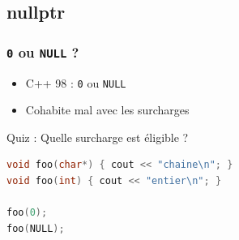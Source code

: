 \documentclass[C++.tex]{subfiles}
\begin{document}
\subsection*{nullptr}
\begin{frame}[fragile]
	\frametitle{\lstinline|0| ou \lstinline|NULL| ?}
	\begin{itemize}
		\item C++ 98 : \lstinline|0| ou \lstinline|NULL|


		\item Cohabite mal avec les surcharges
	\end{itemize}

	\begin{block}{Quiz : Quelle surcharge est éligible ?}
		\begin{lstlisting}[language=C++]
void foo(char*) { cout << "chaine\n"; }
void foo(int) { cout << "entier\n"; }

foo(0);
foo(NULL);\end{lstlisting}
	\end{block}


\end{frame}
\end{document}
